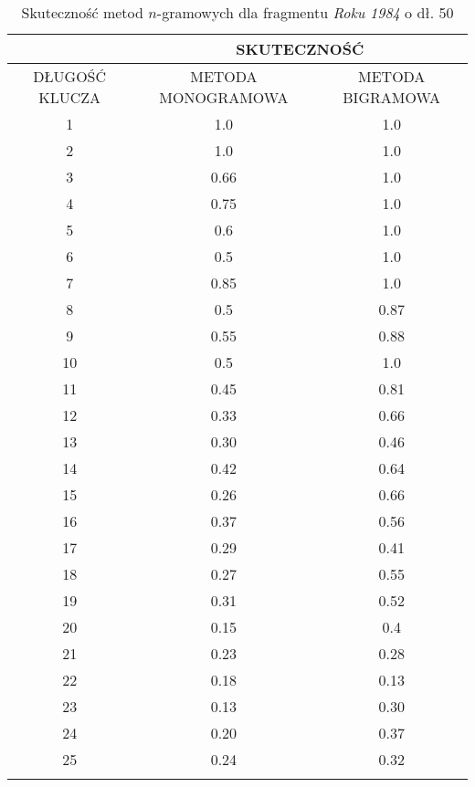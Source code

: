 \documentclass[a4paper]{article}
\theoremstyle{defn}
\theoremstyle{theorem}
\theoremstyle{lemma}
\theoremstyle{cor}
\theoremstyle{fact}
\begin{document}
\begin{center}\begin{longtable}{
|c|c|c|}
\hline   &\multicolumn{2}{|c|}{SKUTECZNOŚĆ} \\ 
\hline DŁUGOŚĆ KLUCZA & METODA MONOGRAMOWA & METODA BIGRAMOWA\\ \hline
1
 & 1.0 & 1.0\\ \hline
2
 & 1.0 & 1.0\\ \hline
3
 & 0.66 & 1.0\\ \hline
4
 & 0.75 & 1.0\\ \hline
5
 & 0.6 & 1.0\\ \hline
6
 & 0.5 & 1.0\\ \hline
7
 & 0.85 & 1.0\\ \hline
8
 & 0.5 & 0.87\\ \hline
9
 & 0.55 & 0.88\\ \hline
10
 & 0.5 & 1.0\\ \hline
11
 & 0.45 & 0.81\\ \hline
12
 & 0.33 & 0.66\\ \hline
13
 & 0.30 & 0.46\\ \hline
14
 & 0.42 & 0.64\\ \hline
15
 & 0.26 & 0.66\\ \hline
16
 & 0.37 & 0.56\\ \hline
17
 & 0.29 & 0.41\\ \hline
18
 & 0.27 & 0.55\\ \hline
19
 & 0.31 & 0.52\\ \hline
20
 & 0.15 & 0.4\\ \hline
21
 & 0.23 & 0.28\\ \hline
22
 & 0.18 & 0.13\\ \hline
23
 & 0.13 & 0.30\\ \hline
24
 & 0.20 & 0.37\\ \hline
25
 & 0.24 & 0.32\\ \hline
 \caption{Skuteczność metod $n$-gramowych dla fragmentu \textit{Roku 1984} o dł. 50}
\end{longtable}\end{center}
\end{document}
